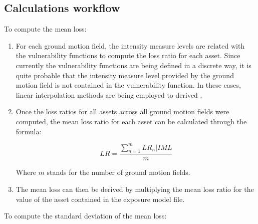 \subsection{Calculations workflow}

To compute the mean loss:

\begin{enumerate}
\item For each ground motion field, the intensity measure levels are related with the vulnerability functions to compute the loss ratio for each asset. Since currently the vulnerability functions are being defined in a discrete way, it is quite  probable that the intensity measure level provided by the ground motion field is not contained in the vulnerability function. In these cases, linear interpolation methods are being employed to derived .

\item Once the loss ratios for all assets across all ground motion fields were computed, the mean loss ratio for each asset can be calculated through the formula:

\begin{equation}
LR=\frac{\sum^m_{n=1}LR_n|IML}{m}
\end{equation}

Where $m$ stands for the number of ground motion fields.

\item The mean loss can then be derived by multiplying the mean loss ratio for the value of the asset contained in the exposure model file.

\end{enumerate}

To compute the standard deviation of the mean loss:

